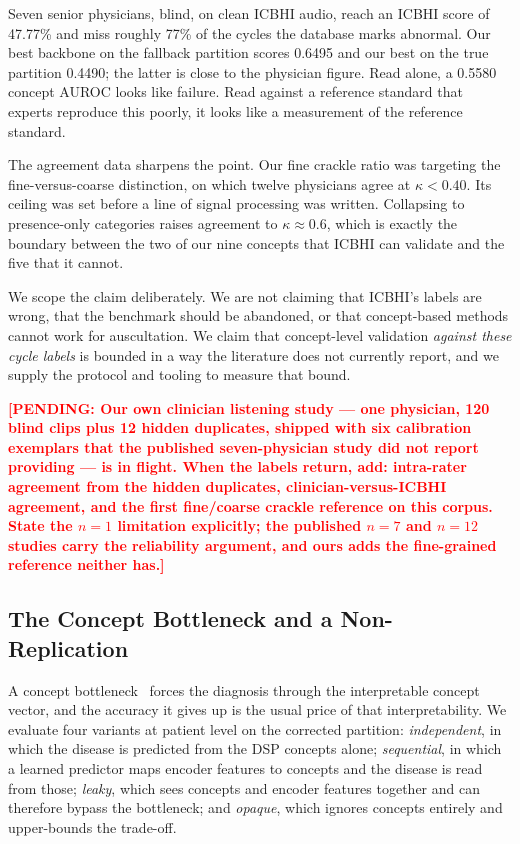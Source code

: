 \documentclass[journal,onecolumn]{IEEEtran}
\newcommand{\pending}[1]{\textcolor{red}{\textbf{[PENDING: #1]}}}
\begin{document}
Seven senior physicians, blind, on clean ICBHI audio, reach an ICBHI score of 47.77\%
and miss roughly 77\% of the cycles the database marks abnormal. Our best backbone on
the fallback partition scores 0.6495 and our best on the true partition 0.4490; the
latter is close to the physician figure. Read alone, a 0.5580 concept AUROC looks like
failure. Read against a reference standard that experts reproduce this poorly, it
looks like a measurement of the reference standard.

The agreement data sharpens the point. Our fine crackle ratio was targeting the
fine-versus-coarse distinction, on which twelve physicians agree at $\kappa < 0.40$.
Its ceiling was set before a line of signal processing was written. Collapsing to
presence-only categories raises agreement to $\kappa \approx 0.6$, which is exactly
the boundary between the two of our nine concepts that ICBHI can validate and the
five that it cannot.

We scope the claim deliberately. We are not claiming that ICBHI's labels are wrong,
that the benchmark should be abandoned, or that concept-based methods cannot work for
auscultation. We claim that concept-level validation \emph{against these cycle
labels} is bounded in a way the literature does not currently report, and we supply
the protocol and tooling to measure that bound.

\pending{Our own clinician listening study --- one physician, 120 blind clips plus 12
hidden duplicates, shipped with six calibration exemplars that the published
seven-physician study did not report providing --- is in flight. When the labels
return, add: intra-rater agreement from the hidden duplicates, clinician-versus-ICBHI
agreement, and the first fine/coarse crackle reference on this corpus. State the
$n=1$ limitation explicitly; the published $n=7$ and $n=12$ studies carry the
reliability argument, and ours adds the fine-grained reference neither has.}

\subsection{The Concept Bottleneck and a Non-Replication}
\label{subsec:bottleneck}

A concept bottleneck~\cite{koh2020cbm} forces the diagnosis through the interpretable
concept vector, and the accuracy it gives up is the usual price of that
interpretability. We evaluate four variants at patient level on the corrected
partition: \emph{independent}, in which the disease is predicted from the DSP concepts
alone; \emph{sequential}, in which a learned predictor maps encoder features to
concepts and the disease is read from those; \emph{leaky}, which sees concepts and
encoder features together and can therefore bypass the bottleneck; and \emph{opaque},
which ignores concepts entirely and upper-bounds the trade-off.
\end{document}
